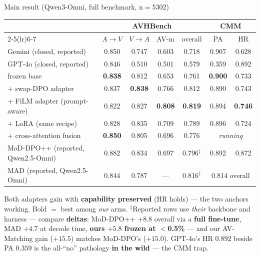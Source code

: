 \documentclass[aspectratio=169,11pt]{beamer}
\begin{document}
\begin{frame}{Main result (Qwen3-Omni, full benchmark, n$=$5302)}
\centering
\renewcommand{\arraystretch}{1.2}
\footnotesize
\begin{tabular}{l cccc cc}
\toprule
& \multicolumn{4}{c}{AVHBench} & \multicolumn{2}{c}{CMM} \\
\cmidrule(lr){2-5}\cmidrule(lr){6-7}
 & $A\!\to\!V$ & $V\!\to\!A$ & AV-m & overall & PA & HR \\
\midrule
Gemini {\tiny(closed, reported)} & 0.850 & 0.747 & 0.603 & 0.718 & 0.907 & 0.628 \\
GPT-4o {\tiny(closed, reported)} & 0.846 & 0.510 & 0.501 & 0.579 & 0.359 & 0.892 \\
\midrule
frozen base              & \textbf{0.838} & 0.812 & 0.653 & 0.761 & \textbf{0.900} & 0.733 \\
+ swap-DPO adapter       & 0.837 & \textbf{0.838} & 0.766 & 0.812 & 0.890 & 0.743 \\
+ FiLM adapter (prompt-aware) & 0.822 & 0.827 & \textbf{0.808} & \textbf{0.819} & 0.894 & \textbf{0.746} \\
\midrule
+ LoRA (same recipe)     & 0.828 & 0.835 & 0.709 & 0.789 & 0.896 & 0.724 \\ %
+ cross-attention fusion & \textbf{0.850} & 0.805 & 0.696 & 0.776 & \multicolumn{2}{c}{\emph{running}} \\ %
\midrule
MoD-DPO++ {\tiny(reported, Qwen2.5-Omni)} & 0.882 & 0.834 & 0.697 & 0.796$^\ddagger$ & 0.892 & 0.872 \\ %
MAD {\tiny(reported, Qwen2.5-Omni)} & 0.844 & 0.787 & --- & 0.816$^\ddagger$ & \multicolumn{2}{c}{0.814 overall} \\ %
\bottomrule
\end{tabular}
\vfill
{\footnotesize Both adapters gain with \textbf{capability preserved} (HR holds) --- the two anchors
working. Bold $=$ best among \emph{our} arms. $^\ddagger$Reported rows use \emph{their} backbone and
harness --- compare \textbf{deltas}: MoD-DPO++ $+8.8$ overall via a \textbf{full fine-tune}, MAD
$+4.7$ at decode time, \textbf{ours $+5.8$ frozen at $<$0.5\%} --- and our AV-Matching gain
($+15.5$) matches MoD-DPO's ($+15.0$).
GPT-4o's HR $0.892$ beside PA $0.359$ is the all-``no'' pathology \textbf{in the wild} --- the CMM trap.}
\end{frame}
\end{document}

